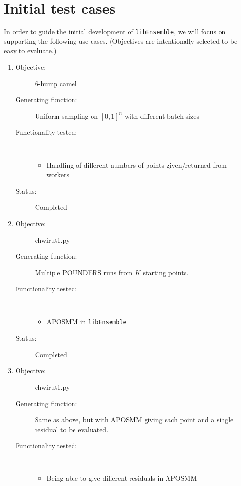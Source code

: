 \documentclass{article}
\newcommand{\libE}{\texttt{libEnsemble}\xspace}
\begin{document}
\section{Initial test cases}
In order to guide the initial development of \libE, we will focus on supporting the following use cases. (Objectives are intentionally selected to be easy to evaluate.)
\begin{enumerate}
  \item 
    \begin{description}
      \item[Objective:] 6-hump camel
      \item[Generating function:] Uniform sampling on $[0,1]^n$ with different batch sizes
      \item[Functionality tested:] \
        \begin{itemize}
          \item Handling of different numbers of points given/returned from workers
        \end{itemize}
      \item[Status:] Completed
    \end{description}
    \bigskip
  \item 
    \begin{description}
      \item[Objective:] chwirut1.py
      \item[Generating function:] Multiple POUNDERS runs from $K$ starting points.
      \item[Functionality tested:] \
        \begin{itemize}
          \item APOSMM in \libE
        \end{itemize}
      \item[Status:] Completed
    \end{description}
    \bigskip
  \item 
    \begin{description}
      \item[Objective:] chwirut1.py
      \item[Generating function:] Same as above, but with APOSMM giving each point and a single residual to be evaluated.
      \item[Functionality tested:] \
        \begin{itemize}
          \item Being able to give different residuals in APOSMM 
        \end{itemize}

\end{description}
\end{enumerate}
\end{document}
